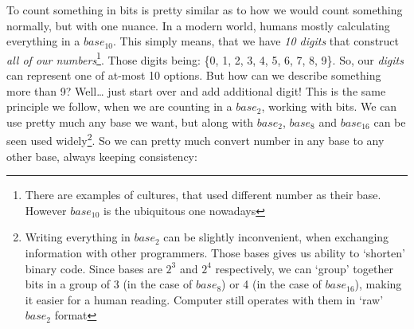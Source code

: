 \documentclass[../../what-is-computer.tex]{subfiles}
\begin{document}
    To count something in bits is pretty similar as to how we would count something normally, but with one nuance. In a modern world, humans mostly calculating 
    everything in a $base_{10}$. This simply means, that we have \emph{10 digits} that construct \emph{all of our numbers}\footnote{There are examples of cultures, that used different number as their base. However $base_{10}$ is the ubiquitous one nowadays}. 
    Those digits being: \{0, 1, 2, 3, 4, 5, 6, 7, 8, 9\}. So, our \emph{digits} can represent one of at-most 10 options. But how can we describe something more
    than 9? Well\ldots{} just start over and add additional digit! This is the same principle we follow, when we are counting in a $base_2$, working with bits.
    We can use pretty much any base we want, but along with $base_2$, $base_8$ and $base_{16}$ can be seen used widely\footnote{Writing everything in $base_2$
    can be slightly inconvenient, when exchanging information with other programmers. Those bases gives us ability to `shorten' binary code. Since bases
    are $2^3$ and $2^4$ respectively, we can `group' together bits in a group of 3 (in the case of $base_8$) or 4 (in the case of $base_{16}$), making it 
    easier for a human reading. Computer still operates with them in `raw' $base_2$ format}. So we can pretty much convert number in any base to any other 
    base, always keeping consistency:
\end{document}
